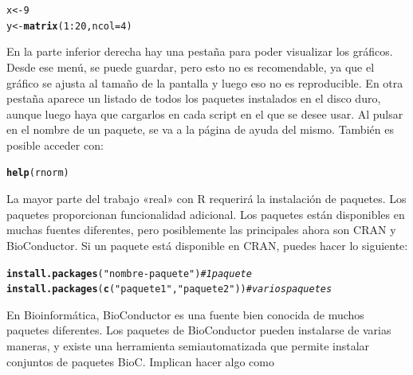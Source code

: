 \documentclass{config/apuntes}\usepackage[]{graphicx}\usepackage[]{xcolor}
\makeatletter
\newcommand{\hlnum}[1]{\textcolor[rgb]{0.686,0.059,0.569}{#1}}%
\newcommand{\hlsng}[1]{\textcolor[rgb]{0.192,0.494,0.8}{#1}}%
\newcommand{\hlcom}[1]{\textcolor[rgb]{0.678,0.584,0.686}{\textit{#1}}}%
\newcommand{\hlopt}[1]{\textcolor[rgb]{0,0,0}{#1}}%
\newcommand{\hldef}[1]{\textcolor[rgb]{0.345,0.345,0.345}{#1}}%
\newcommand{\hlkwb}[1]{\textcolor[rgb]{0.69,0.353,0.396}{#1}}%
\newcommand{\hlkwc}[1]{\textcolor[rgb]{0.333,0.667,0.333}{#1}}%
\newcommand{\hlkwd}[1]{\textcolor[rgb]{0.737,0.353,0.396}{\textbf{#1}}}%
\newenvironment{kframe}{%
 \def\at@end@of@kframe{}%
 \ifinner\ifhmode%
  \def\at@end@of@kframe{\end{minipage}}%
  \begin{minipage}{\columnwidth}%
 \fi\fi%
 \def\FrameCommand##1{\hskip\@totalleftmargin \hskip-\fboxsep
 \colorbox{shadecolor}{##1}\hskip-\fboxsep
     \hskip-\linewidth \hskip-\@totalleftmargin \hskip\columnwidth}%
 \MakeFramed {\advance\hsize-\width
   \@totalleftmargin\z@ \linewidth\hsize
   \@setminipage}}%
 {\par\unskip\endMakeFramed%
 \at@end@of@kframe}
\newenvironment{knitrout}{}{} %
\makeatother
\begin{document}
\begin{knitrout}
\color{fgcolor}\begin{kframe}
\begin{alltt}
\hldef{x} \hlkwb{<-} \hlnum{9}
\hldef{y} \hlkwb{<-} \hlkwd{matrix}\hldef{(}\hlnum{1}\hlopt{:}\hlnum{20}\hldef{,} \hlkwc{ncol} \hldef{=} \hlnum{4}\hldef{)}
\end{alltt}
\end{kframe}
\end{knitrout}

En la parte inferior derecha hay una pestaña para poder visualizar los gráficos. Desde ese menú, se puede guardar, pero esto no es recomendable, ya que el gráfico se ajusta al tamaño de la pantalla y luego eso no es reproducible. En otra pestaña aparece un listado de todos los paquetes instalados en el disco duro, aunque luego haya que cargarlos en cada script en el que se desee usar. Al pulsar en el nombre de un paquete, se va a la página de ayuda del mismo. También es posible acceder con:

\begin{knitrout}
\color{fgcolor}\begin{kframe}
\begin{alltt}
\hlkwd{help}\hldef{(rnorm)}
\end{alltt}
\end{kframe}
\end{knitrout}

La mayor parte del trabajo «real» con R requerirá la instalación de paquetes. Los paquetes proporcionan funcionalidad adicional. Los paquetes están disponibles en muchas fuentes diferentes, pero posiblemente las principales ahora son CRAN y BioConductor. Si un paquete está disponible en CRAN, puedes hacer lo siguiente:

\begin{knitrout}
\color{fgcolor}\begin{kframe}
\begin{alltt}
\hlkwd{install.packages}\hldef{(}\hlsng{"nombre-paquete"}\hldef{)} \hlcom{# 1 paquete}
\hlkwd{install.packages}\hldef{(}\hlkwd{c}\hldef{(}\hlsng{"paquete1"}\hldef{,} \hlsng{"paquete2"}\hldef{))} \hlcom{# varios paquetes}
\end{alltt}
\end{kframe}
\end{knitrout}

En Bioinformática, BioConductor es una fuente bien conocida de muchos paquetes diferentes. Los paquetes de BioConductor pueden instalarse de varias maneras, y existe una herramienta semiautomatizada que permite instalar conjuntos de paquetes BioC. Implican hacer algo como
\end{document}
